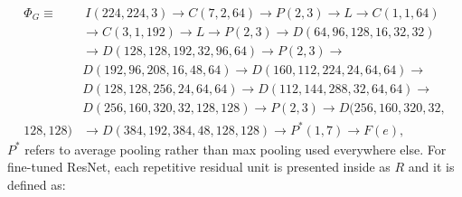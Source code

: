 \documentclass[journal]{IEEEtran}%
\begin{document}
{\tiny
\begin{equation}\label{GoogleNet}
\begin{aligned}
\Phi_G \equiv & ~I(224,224,3) \longrightarrow C(7,2,64) \longrightarrow P(2,3) \longrightarrow L \longrightarrow C(1,1,64)\\
      & \longrightarrow C(3,1,192) \longrightarrow L \longrightarrow P(2,3) \longrightarrow D(64,96,128,16,32,32) \\
      & \longrightarrow D(128,128,192,32,96,64) \longrightarrow P(2,3) \longrightarrow \\
      & D(192,96,208,16,48,64) \longrightarrow D(160,112,224,24,64,64) \longrightarrow \\
      & D(128,128,256,24,64,64) \longrightarrow D(112,144,288,32,64,64) \longrightarrow \\
      & D(256,160,320,32,128,128) \longrightarrow P(2,3) \longrightarrow D(256,160,320,32,\\128,128)
      & \longrightarrow D(384,192,384,48,128,128) \longrightarrow P^*(1,7) \longrightarrow F(e),
\end{aligned}
\end{equation}
}
$P^*$ refers to average pooling rather than max pooling used everywhere else. For fine-tuned ResNet, each repetitive residual unit is presented inside as $R$ and it is defined as:
\end{document}
